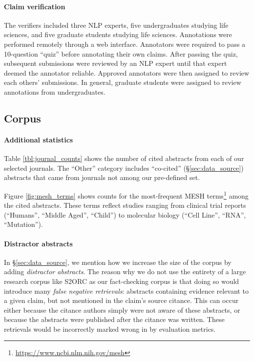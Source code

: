 \paragraph{Claim verification}

The verifiers included three NLP experts, five undergraduates studying life sciences, and five graduate students studying life sciences. Annotations were performed remotely through a web interface. Annotators were required to pass a 10-question ``quiz'' before annotating their own claims. After passing the quiz, subsequent submissions were reviewed by an NLP expert until that expert deemed the annotator reliable. Approved annotators were then assigned to review each others' submissions. In general, graduate students were assigned to review annotations from undergraduates.




\subsection{Corpus} \label{sec:data_source_appendix}

\paragraph{Additional statistics} Table \ref{tbl:journal_counts} shows the number of cited abstracts from each of our selected journals. The ``Other'' category includes ``co-cited'' (\S\ref{sec:data_source}) abstracts that came from journals not among our pre-defined set.



Figure \ref{fig:mesh_terms} shows counts for the most-frequent MESH terms\footnote{\url{https://www.ncbi.nlm.nih.gov/mesh}} among the cited abstracts. These terms reflect studies ranging from clinical trial reports (``Humans'', ``Middle Aged'', ``Child'') to molecular biology (``Cell Line'', ``RNA'', ``Mutation'').



\paragraph{Distractor abstracts} In \S\ref{sec:data_source}, we mention how we increase the size of the corpus by adding \emph{distractor abstracts}. The reason why we do not use the entirety of a large research corpus like S2ORC as our fact-checking corpus is that doing so would introduce many \emph{false negative retrievals}: abstracts containing evidence relevant to a given claim, but not mentioned in the claim's source citance. This can occur either because the citance authors simply were not aware of these abstracts, or because the abstracts were published after the citance was written. These retrievals would be incorrectly marked wrong in by evaluation metrics.

